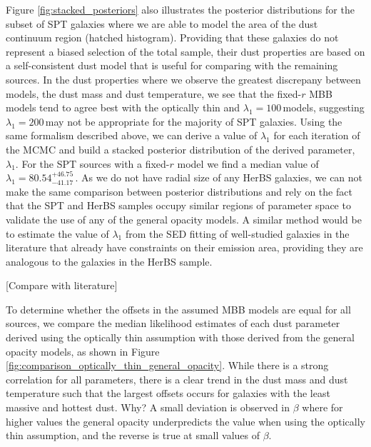 Figure \ref{fig:stacked_posteriors} also illustrates the posterior distributions for the subset of SPT galaxies where we are able to model the area of the dust continuum region (hatched histogram). Providing that these galaxies do not represent a biased selection of the total sample, their dust properties are based on a self-consistent dust model that is useful for comparing with the remaining sources. In the dust properties where we observe the greatest discrepany between models, the dust mass and dust temperature, we see that the fixed-$r$ MBB models tend to agree best with the optically thin and $\lambda_1 = 100$\,\micron models, suggesting $\lambda_1 = 200$\,\micron may not be appropriate for the majority of SPT galaxies. Using the same formalism described above, we can derive a value of $\lambda_1$ for each iteration of the MCMC and build a stacked posterior distribution of the derived parameter, $\lambda_1$. For the SPT sources with a fixed-$r$ model we find a median value of $\lambda_1 = 80.54_{-41.17}^{+46.75}$\,\micron. As we do not have radial size of any HerBS galaxies, we can not make the same comparison between posterior distributions and rely on the fact that the SPT and HerBS samples occupy similar regions of parameter space to validate the use of any of the general opacity models. A similar method would be to estimate the value of $\lambda_1$ from the SED fitting of well-studied galaxies in the literature that already have constraints on their emission area, providing they are analogous to the galaxies in the HerBS sample. 

{\color{red} [Compare with literature]}

To determine whether the offsets in the assumed MBB models are equal for all sources, we compare the median likelihood estimates of each dust parameter derived using the optically thin assumption with those derived from the general opacity models, as shown in Figure \ref{fig:comparison_optically_thin_general_opacity}. While there is a strong correlation for all parameters, there is a clear trend in the dust mass and dust temperature such that the largest offsets occurs for galaxies with the least massive and hottest dust. {\color{red} Why?} A small deviation is observed in $\beta$ where for higher values the general opacity underpredicts the value when using the optically thin assumption, and the reverse is true at small values of $\beta$.

